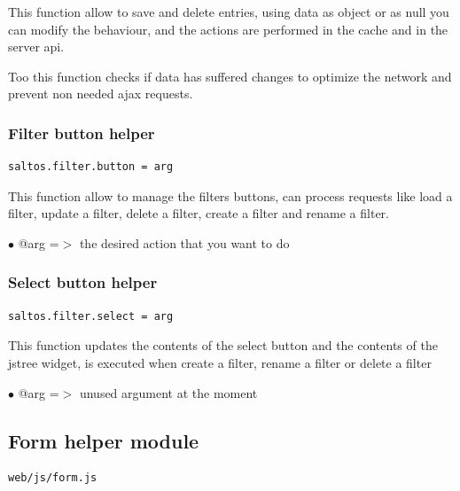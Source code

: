 \documentclass[a4paper]{article}
\begin{document}
This function allow to save and delete entries, using data as object or as null
you can modify the behaviour, and the actions are performed in the cache and
in the server api.

Too this function checks if data has suffered changes to optimize the network
and prevent non needed ajax requests.

\hypertarget{toc214}{}
\subsubsection{Filter button helper}

\begin{lstlisting}
saltos.filter.button = arg
\end{lstlisting}

This function allow to manage the filters buttons, can process requests
like load a filter, update a filter, delete a filter, create a filter and
rename a filter.

\begin{compactitem}
\item[\color{myblue}$\bullet$] @arg =$>$ the desired action that you want to do
\end{compactitem}

\hypertarget{toc215}{}
\subsubsection{Select button helper}

\begin{lstlisting}
saltos.filter.select = arg
\end{lstlisting}

This function updates the contents of the select button and the contents of
the jstree widget, is executed when create a filter, rename a filter or delete
a filter

\begin{compactitem}
\item[\color{myblue}$\bullet$] @arg =$>$ unused argument at the moment
\end{compactitem}

\hypertarget{toc216}{}
\subsection{Form helper module}

\begin{lstlisting}
web/js/form.js
\end{lstlisting}
\end{document}
